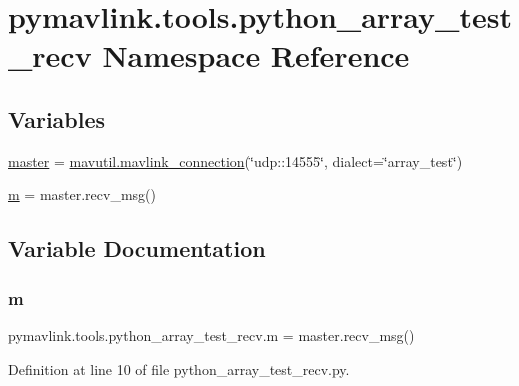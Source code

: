 \hypertarget{namespacepymavlink_1_1tools_1_1python__array__test__recv}{}\section{pymavlink.\+tools.\+python\+\_\+array\+\_\+test\+\_\+recv Namespace Reference}
\label{namespacepymavlink_1_1tools_1_1python__array__test__recv}
\subsection*{Variables}
\begin{DoxyCompactItemize}
\item 
\mbox{\hyperlink{namespacepymavlink_1_1tools_1_1python__array__test__recv_a79383ef9a6c4bfab99d314dfff40fc5b}{master}} = \mbox{\hyperlink{namespacepymavlink_1_1mavutil_aa6c4b8861f86ef3bb746fa0fab241c93}{mavutil.\+mavlink\+\_\+connection}}(\char`\"{}udp\+::14555\char`\"{}, dialect=\char`\"{}array\+\_\+test\char`\"{})
\item 
\mbox{\hyperlink{namespacepymavlink_1_1tools_1_1python__array__test__recv_a5c795901f23fd86986a21debf4062182}{m}} = master.\+recv\+\_\+msg()
\end{DoxyCompactItemize}


\subsection{Variable Documentation}
\mbox{\label{namespacepymavlink_1_1tools_1_1python__array__test__recv_a5c795901f23fd86986a21debf4062182}} 
\subsubsection{\texorpdfstring{m}{m}}
{\footnotesize\ttfamily pymavlink.\+tools.\+python\+\_\+array\+\_\+test\+\_\+recv.\+m = master.\+recv\+\_\+msg()}



Definition at line 10 of file python\+\_\+array\+\_\+test\+\_\+recv.\+py.

\mbox{\label{namespacepymavlink_1_1tools_1_1python__array__test__recv_a79383ef9a6c4bfab99d314dfff40fc5b}} 
